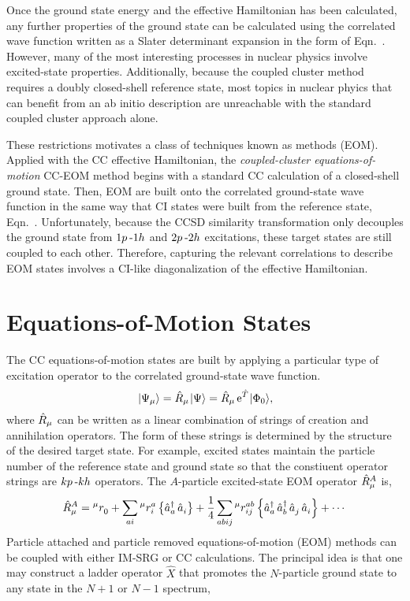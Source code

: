 \documentclass[thesis.tex]{subfiles}
\begin{document}
Once the ground state energy and the effective Hamiltonian has been calculated, any further properties of the ground state can be calculated using the correlated wave function written as a Slater determinant expansion in the form of Eqn.\ \cite{eq:cc_ansatz}.  However, many of the most interesting processes in nuclear physics involve excited-state properties.  Additionally, because the coupled cluster method requires a doubly closed-shell reference state, most topics in nuclear phyics that can benefit from an ab initio description are unreachable with the standard coupled cluster approach alone.

These restrictions motivates a class of techniques known as  methods (EOM).  Applied with the CC effective Hamiltonian, the \textit{coupled-cluster equations-of-motion} CC-EOM method begins with a standard CC calculation of a closed-shell ground state.  Then, EOM  are built onto the correlated ground-state wave function in the same way that CI states were built from the reference state, Eqn.\ \cite{eq:ci_expansion}.  Unfortunately, because the CCSD similarity transformation only decouples the ground state from $1p\hspace{2pt}\text{-}1h$ and $2p\hspace{2pt}\text{-}2h$ excitations, these target states are still coupled to each other.  Therefore, capturing the relevant correlations to describe EOM states involves a CI-like diagonalization of the effective Hamiltonian.


\section{Equations-of-Motion States} \label{section:eom_target_states}

The CC equations-of-motion states are built by applying a particular type of excitation operator to the correlated ground-state wave function.
\begin{equation}\label{eq:ladder_def}
  \hspace{1pt}\lvert \Psi_{\mu} \rangle = \hat{R}\hspace{-0.1pt}_{\mu}\hspace{1pt}\lvert \Psi \rangle = \hat{R}\hspace{-0.1pt}_{\mu}\operatorname{e}^{\hat{T}\hspace{-0.25pt}}\hspace{1pt}\lvert \Phi_{0} \rangle,
\end{equation}
where $\hat{R}\hspace{-0.1pt}_{\mu}$ can be written as a linear combination of strings of creation and annihilation operators.  The form of these strings is determined by the structure of the desired target state.  For example, excited states maintain the particle number of the reference state and ground state so that the constiuent operator strings are $kp\hspace{2pt}\text{-}kh$ operators.  The $A$-particle excited-state EOM operator $\hat{R}\hspace{-0.1pt}^{A}_{\mu}$ is,
\begin{equation}
  \hat{R}\hspace{-0.1pt}^{A}_{\mu} = {}^{\mu}r^{}_{0} + \sum_{ai}{}^{\mu}r^{a}_{i}\left\{\mathop{\hat{a}^{\dagger}_{a}}\mathop{\hat{a}^{}_{i}}\right\} + \frac{1}{4}\sum_{abij}{}^{\mu}r^{ab}_{ij}\left\{\mathop{\hat{a}^{\dagger}_{a}}\mathop{\hat{a}^{\dagger}_{b}}\mathop{\hat{a}^{}_{j}}\mathop{\hat{a}^{}_{i}}\right\} + \cdots
\end{equation}
Particle attached and particle removed equations-of-motion (EOM) methods can be coupled with either IM-SRG or CC calculations. The principal idea is that one may construct a ladder operator $\hat{X}$ that promotes the $N$-particle ground state to any state in the $N + 1$ or $N - 1$ spectrum,
\end{document}
